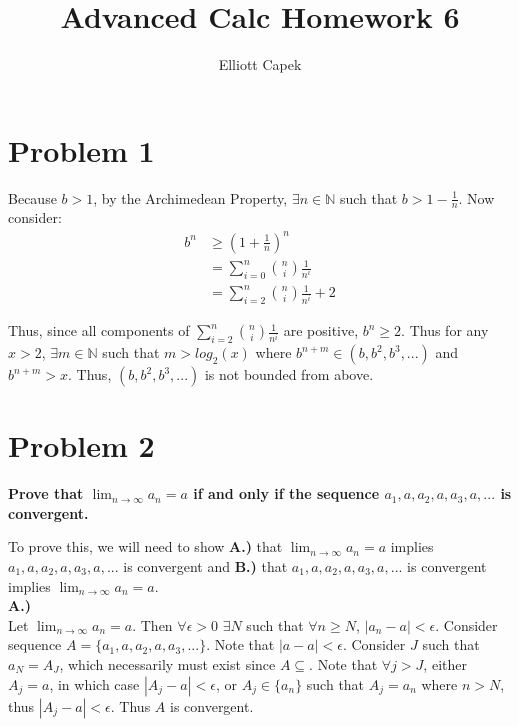 \documentclass[10pt]{article} %
\title{Advanced Calc Homework 6}
\author{Elliott Capek}
\begin{document}
\maketitle{}

\section{Problem 1}
Because $b>1$, by the Archimedean Property, $\exists n \in \mathbb{N}$ such that $b > 1 - \frac{1}{n}$. Now consider:\\

\begin{align*}
  b^n &\geq \left(1 + \frac{1}{n}\right)^n\\
  &= \sum_{i=0}^{n}{n \choose i}\frac{1}{n^i}\\
  &= \sum_{i=2}^{n}{n \choose i}\frac{1}{n^i} + 2
\end{align*}

Thus, since all components of $\sum_{i=2}^{n}{n \choose i}\frac{1}{n^i}$ are positive, $b^n \geq 2$. Thus for any $x>2$, $\exists m \in \mathbb{N}$ such that $m > log_2(x)$ where $b^{n+m} \in \left(b, b^2, b^3, ...\right)$ and $b^{n+m}>x$. Thus, $\left(b, b^2, b^3, ...\right)$ is not bounded from above.\\

\section{Problem 2}
\textbf{Prove that $\lim_{n\rightarrow\infty}a_n = a$ if and only if the sequence $a_1, a, a_2, a, a_3, a,...$ is convergent.}

To prove this, we will need to show \textbf{A.)} that $\lim_{n\rightarrow\infty}a_n = a$ implies $a_1, a, a_2, a, a_3, a,...$ is convergent and \textbf{B.)} that $a_1, a, a_2, a, a_3, a,...$ is convergent implies $\lim_{n\rightarrow\infty}a_n = a$.\\

\textbf{A.)}\\
Let $\lim_{n\rightarrow\infty}a_n = a$. Then $\forall \epsilon>0$ $\exists N$ such that $\forall n \geq N$, $|a_n-a|<\epsilon$. Consider sequence $A = \{a_1, a, a_2, a, a_3, ...\}$. Note that $|a-a|<\epsilon$. Consider $J$ such that $a_N = A_J$, which necessarily must exist since $A \subseteq$. Note that $\forall j>J$, either $A_j = a$, in which case $|A_j-a|<\epsilon$, or $A_j \in \{a_n\}$ such that $A_j = a_n$ where $n > N$, thus $|A_j-a|<\epsilon$. Thus $A$ is convergent.\\
\end{document}
